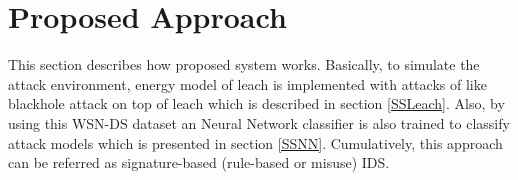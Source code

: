 \section{Proposed Approach} \label{SPA}
This section describes how proposed system works. Basically, to simulate the attack environment, energy model of leach is implemented with attacks of like blackhole attack on top of leach which is described in section \ref{SSLeach}. Also, by using this WSN-DS dataset an Neural Network classifier is also trained to classify attack models which is presented in section \ref{SSNN}. Cumulatively, this approach can be referred as signature-based (rule-based or misuse) IDS.
